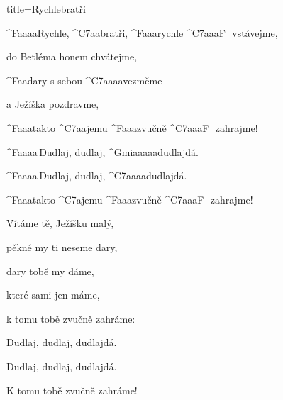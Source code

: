 \begin{song}{title=\predtitle\centering Rychle\carka bratři \\\large   \vspace*{-0.3cm}}  %
\begin{centerjustified}
\nejnejvetsi

\sloka
	^{F{\color{white}aaaa}}Rychle, ^{C7{\color{white}aa}}bratři,	^{F{\color{white}aaa}}rychle ^{C7{\color{white}aaa}F\,\,\,\,}vstávejme, 

	do Betléma honem chvátejme,

	^{F{\color{white}aa}}dary s sebou ^{C7{\color{white}aaaa}}vezměme

	a Ježíška pozdravme,

	^{F{\color{white}aaa}}takto ^{C7{\color{white}aa}}jemu ^{F{\color{white}aaa}}zvučně ^{C7{\color{white}aaa}F\,\,\,\,}zahrajme!

	^{F{\color{white}aaaa}\,}Dudlaj, dudlaj, ^{Gmi{\color{white}aaaaa}}dudlajdá.

	^{F{\color{white}aaaa}\,}Dudlaj, dudlaj, ^{C7{\color{white}aaaa}}dudlajdá.

	^{F{\color{white}aaa}}takto ^{C7{\color{white}a}}jemu ^{F{\color{white}aaa}}zvučně ^{C7{\color{white}aaa}F\,\,\,\,}zahrajme!

\sloka
	Vítáme tě, Ježíšku malý,

	pěkné my ti neseme dary,

	dary tobě my dáme,

	které sami jen máme,

	k tomu tobě zvučně zahráme:

	Dudlaj, dudlaj, dudlajdá.

	Dudlaj, dudlaj, dudlajdá.

	K tomu tobě zvučně zahráme!


\end{centerjustified}
\setcounter{Slokočet}{0}
\end{song}

